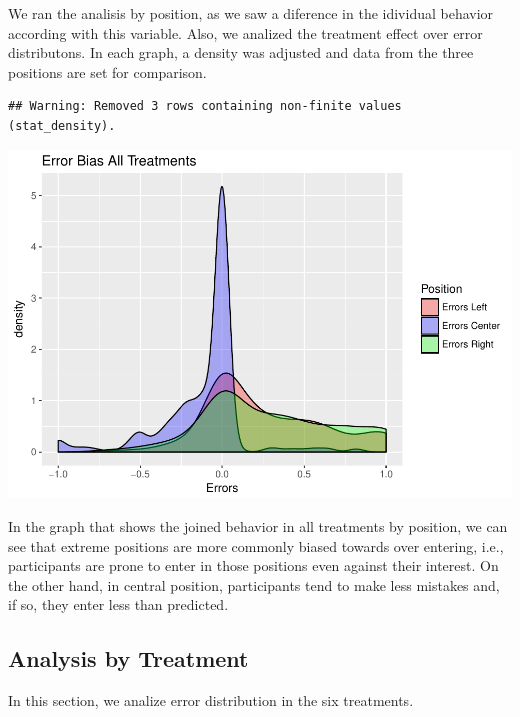 \documentclass[]{article}
\begin{document}
We ran the analisis by position, as we saw a diference in the idividual
behavior according with this variable. Also, we analized the treatment
effect over error distributons. In each graph, a density was adjusted
and data from the three positions are set for comparison.

\begin{verbatim}
## Warning: Removed 3 rows containing non-finite values (stat_density).
\end{verbatim}

\includegraphics{individual_analysis_report_files/figure-latex/unnamed-chunk-8-1.pdf}

In the graph that shows the joined behavior in all treatments by
position, we can see that extreme positions are more commonly biased
towards over entering, i.e., participants are prone to enter in those
positions even against their interest. On the other hand, in central
position, participants tend to make less mistakes and, if so, they enter
less than predicted.

\subsection{Analysis by Treatment}\label{analysis-by-treatment}

In this section, we analize error distribution in the six treatments.
\end{document}
